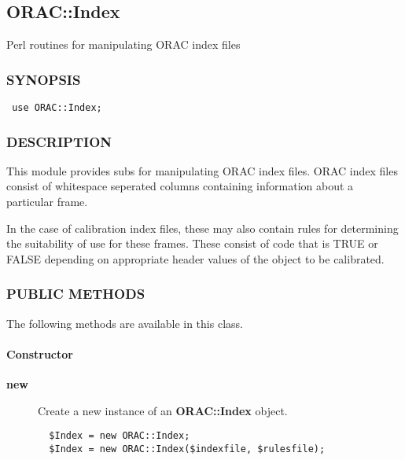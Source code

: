 \begin{description}
\begin{description}
\subsection{ORAC::Index\label{ORAC::Index}}


Perl routines for manipulating ORAC index files

\subsubsection*{SYNOPSIS\label{ORAC::Index_SYNOPSIS}}
\begin{verbatim}
 use ORAC::Index;
\end{verbatim}
\subsubsection*{DESCRIPTION\label{ORAC::Index_DESCRIPTION}}


This module provides subs for manipulating ORAC index files. ORAC
index files consist of whitespace seperated columns containing
information about a particular frame.



In the case of calibration index files, these may also contain rules
for determining the suitability of use for these frames. These consist
of code that is TRUE or FALSE depending on appropriate header values
of the object to be calibrated.

\subsubsection*{PUBLIC METHODS\label{ORAC::Index_PUBLIC_METHODS}}


The following methods are available in this class.

\paragraph*{Constructor\label{ORAC::Index_Constructor}}
\begin{description}

\item[{\textbf{new}}] \mbox{}

Create a new instance of an \textbf{ORAC::Index} object.

\begin{verbatim}
  $Index = new ORAC::Index;
  $Index = new ORAC::Index($indexfile, $rulesfile);
\end{verbatim}



\end{description}
\end{description}
\end{description}
